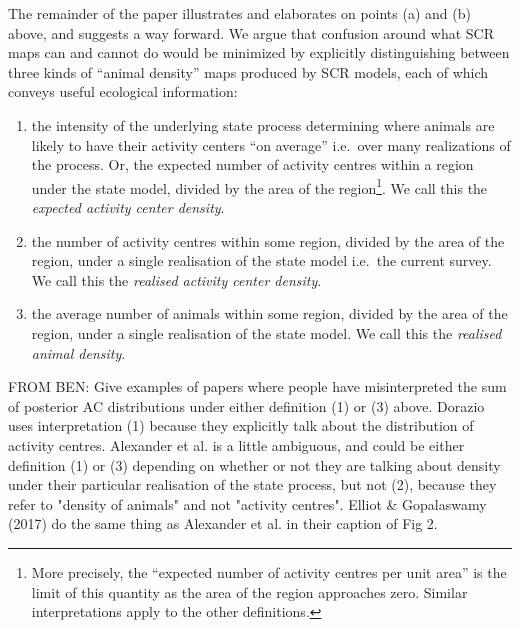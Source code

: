 \documentclass[a4paper,12pt]{article}
\begin{document}
The remainder of the paper illustrates and elaborates on points (a) and (b) above, and suggests a way forward. We argue that confusion around what SCR maps can and cannot do would be minimized by explicitly distinguishing between three kinds of ``animal density'' maps produced by SCR models, each of which conveys useful ecological information:

\begin{enumerate}
\item the intensity of the underlying state process determining where animals are likely to have their activity centers ``on average''  i.e.\ over many realizations of the process. Or, the expected number of activity centres within a region under the state model, divided by the area of the region\footnote{More precisely, the ``expected number of activity centres per unit area'' is the limit of this quantity as the area of the region approaches zero. Similar interpretations apply to the other definitions.}. We call this the {\it expected activity center density}.
\item the number of activity centres within some region, divided by the area of the region, under a single realisation of the state model i.e.\ the current survey. We call this the {\it realised activity center density}.
\item the average number of animals within some region, divided by the area of the region, under a single realisation of the state model. We call this the {\it realised animal density}.
\end{enumerate}

FROM BEN: Give examples of papers where people have misinterpreted the sum of posterior AC distributions under either definition (1) or (3) above. Dorazio uses interpretation (1) because they explicitly talk about the distribution of activity centres. Alexander et al. is a little ambiguous, and could be either definition (1) or (3) depending on whether or not they are talking about density under their particular realisation of the state process, but not (2), because they refer to "density of animals" and not "activity centres". Elliot \& Gopalaswamy (2017) do the same thing as Alexander et al. in their caption of Fig 2.
\end{document}
